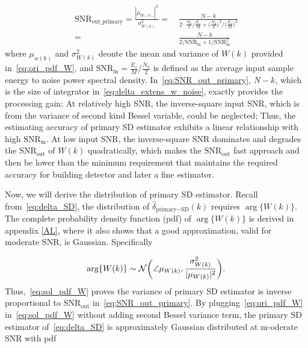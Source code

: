 \begin{equation}
  \begin{aligned}
    \label{eq:SNR_out_primary}
    \text{SNR}_{\text{out\_primary}}=\frac{|\mu_{W(k)}|^2}{\sigma^2_{W(k)}} 
    =&~\frac{N-k}{ 2\cdot\frac{N_0}{2}\Big/\frac{E_s}{M}+\big(\frac{N_0}{2}\big)^2\Big/\big(\frac{E_s}{M}\big)^2} \\
    =&~\frac{N-k}{2/\text{SNR}_{\text{in}}+1/\text{SNR}_{\text{in}}^2}
  \end{aligned}
\end{equation}
where $\mu_{w(k)}$ and $\sigma^2_{W(k)}$ deonte the mean and variance of $W(k)$ provided in~\eqref{eq:ori_pdf_W}, 
and $\text{SNR}_{\text{in}}=\frac{E_s}{M}\big/\frac{N_0}{2}$ is defined as the average input sample energy to noise power spectral density. In~\eqref{eq:SNR_out_primary}, 
$N-k$, which is the size of integrator in~\eqref{eq:delta_extens_w_noise}, exactly provides the processing gain; At relatively high SNR,
the inverse-square input SNR, which is from the variance of second kind Bessel variable, could be neglected; Thus, the estimating accuracy of primary SD estimator
exhibits a linear relationship with high $\text{SNR}_{\text{in}}$. 
At low input SNR, 
the inverse-square SNR dominates and degrades the $\text{SNR}_{\text{out}}$
of $W(k)$ quadratically, which makes the $\text{SNR}_{\text{out}}$ fast approach and then be lower than the minimum requirement that maintains the required accuracy for building detector and later a fine estimator. 

Now, we will derive the distribution of primary SD estimator.
Recall from~\eqref{eq:delta_SD}, the distribution of $\hat{\delta}_{\text{primary}-\text{SD}}(k)$ requires $\arg\{W(k)\}$.
The complete probability density function (pdf) of $\arg\{W(k)\}$ is derived in appendix \ref{AL},
where it also shows that a good approximation, valid for moderate SNR, 
is Gaussian. Specifically 

\begin{equation}
    \label{eq:sol_pdf_W}
    \arg\{W(k)\} \sim \mathcal{N}\bigg(\angle \mu_{W(k)},\frac{\sigma^2_{W(k)}}{|\mu_{W(k)}|^2}\bigg).
  \end{equation}
Thus,~\eqref{eq:sol_pdf_W} proves the variance of primary SD estimator is inverse proportional to $\text{SNR}_{\text{out}}$ in~\eqref{eq:SNR_out_primary}.
By plugging~\eqref{eq:ori_pdf_W} in~\eqref{eq:sol_pdf_W} without adding second Bessel variance term, the primary SD estimator of~\eqref{eq:delta_SD}
is approximately Gaussian distributed at m-oderate SNR with pdf

